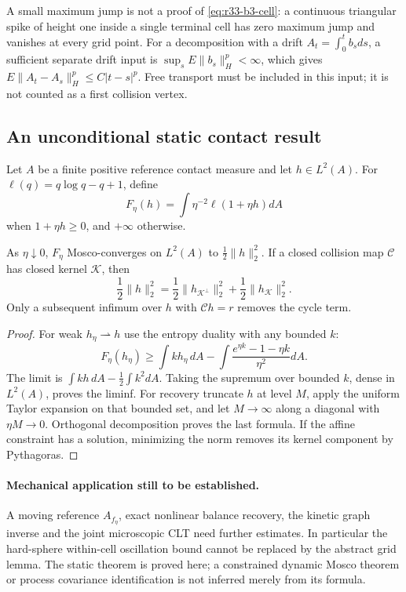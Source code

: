 A small maximum jump is not a proof of \eqref{eq:r33-b3-cell}: a continuous triangular spike of height one inside a single terminal cell has zero maximum jump and vanishes at every grid point. For a decomposition with a drift $A_t=\int_0^t b_sds$, a sufficient separate drift input is $\sup_sE\|b_s\|_H^p<\infty$, which gives $E\|A_t-A_s\|_H^p\le C|t-s|^p$. Free transport must be included in this input; it is not counted as a first collision vertex.

\subsection{An unconditional static contact result}
Let $A$ be a finite positive reference contact measure and let $h\in L^2(A)$. For $\ell(q)=q\log q-q+1$, define
\[
 F_\eta(h)=\int\eta^{-2}\ell(1+\eta h)dA
\]
when $1+\eta h\ge0$, and $+\infty$ otherwise.

\begin{theorem}
\label{thm:r33-b3-static}
As $\eta\downarrow0$, $F_\eta$ Mosco-converges on $L^2(A)$ to $\frac12\|h\|_2^2$. If a closed collision map $\mathcal C$ has closed kernel $\mathcal K$, then
\[
 \frac12\|h\|_2^2=\frac12\|h_{\mathcal K^\perp}\|_2^2+
                  \frac12\|h_{\mathcal K}\|_2^2.
\]
Only a subsequent infimum over $h$ with $\mathcal Ch=r$ removes the cycle term.
\end{theorem}

\begin{proof}
For weak $h_\eta\rightharpoonup h$ use the entropy duality with any bounded $k$:
\[
 F_\eta(h_\eta)\ge\int kh_\eta\,dA-
              \int\frac{e^{\eta k}-1-\eta k}{\eta^2}dA.
\]
The limit is $\int kh\,dA-\frac12\int k^2dA$. Taking the supremum over bounded $k$, dense in $L^2(A)$, proves the liminf. For recovery truncate $h$ at level $M$, apply the uniform Taylor expansion on that bounded set, and let $M\to\infty$ along a diagonal with $\eta M\to0$. Orthogonal decomposition proves the last formula. If the affine constraint has a solution, minimizing the norm removes its kernel component by Pythagoras.
\end{proof}

\paragraph{Mechanical application still to be established.}
A moving reference $A_{f_\eta}$, exact nonlinear balance recovery, the kinetic graph inverse and the joint microscopic CLT need further estimates. In particular the hard-sphere within-cell oscillation bound cannot be replaced by the abstract grid lemma. The static theorem is proved here; a constrained dynamic Mosco theorem or process covariance identification is not inferred merely from its formula.
